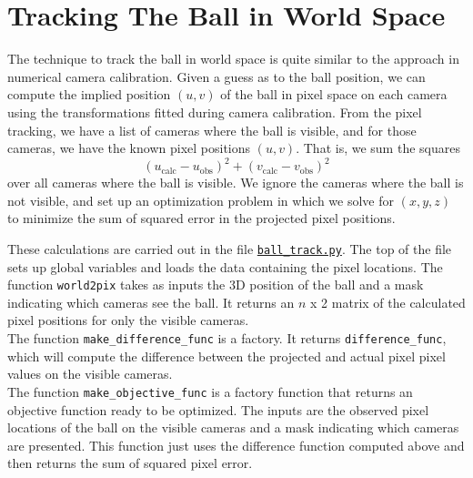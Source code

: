 \documentclass{article}
\begin{document}
\newpage
\section{Tracking The Ball in World Space}
The technique to track the ball in world space is quite similar to the approach in numerical camera calibration.
Given a guess as to the ball position, we can compute the implied position $(u, v)$ of the ball in pixel space
on each camera using the transformations fitted during camera calibration.
From the pixel tracking, we have a list of cameras where the ball is visible, 
and for those cameras, we have the known pixel positions $(u, v)$.
That is, we sum the squares 
$${ (u_\text{calc} - u_\text{obs})^2 + (v_\text{calc} - v_\text{obs})^2}$$
over all cameras where the ball is visible.
We ignore the cameras where the ball is not visible, and set up an optimization problem 
in which we solve for $(x, y, z)$ to minimize the sum of squared error in the projected pixel positions.

These calculations are carried out in the file 
\href{https://github.com/Harvard-AM-205-Basketball/Basketball/blob/master/src/ball_track.py}
{\texttt{ball\_track.py}}.  
The top of the file sets up global variables and loads the data containing the pixel locations.
The function \texttt{world2pix} takes as inputs the 3D position of the ball 
and a mask indicating which cameras see the ball.  
It returns an $n$ x 2 matrix of the calculated pixel positions  for only the visible cameras. \\
The function \texttt{make\_difference\_func} is a factory.  
It returns \texttt{difference\_func}, which will compute the difference between the projected
and actual pixel pixel values on the visible cameras. \\
The function \texttt{make\_objective\_func} is a factory function that returns an objective
function ready to be optimized.  
The inputs are the observed pixel locations of the ball on the visible cameras 
and a mask indicating which cameras are presented.  
This function just uses the difference function computed above 
and then returns the sum of squared pixel error.
\end{document}
